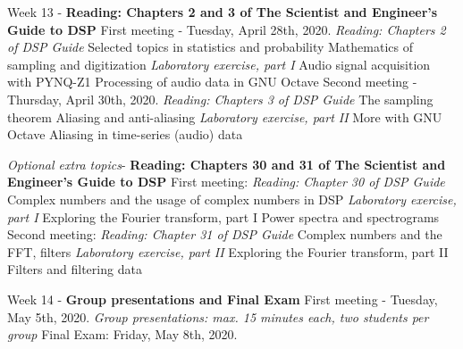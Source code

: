 \documentclass[10pt]{article}
\begin{document}
\begin{outline}[enumerate]
\1 Week 13 - \textbf{Reading: Chapters 2 and 3 of The Scientist and Engineer's Guide to DSP}
\2 First meeting - Tuesday, April 28th, 2020. \textit{Reading: Chapters 2 of DSP Guide}
\3 Selected topics in statistics and probability
\3 Mathematics of sampling and digitization
\3 \textit{Laboratory exercise, part I}
\4 Audio signal acquisition with PYNQ-Z1
\4 Processing of audio data in GNU Octave
\2 Second meeting - Thursday, April 30th, 2020. \textit{Reading: Chapters 3 of DSP Guide}
\3 The sampling theorem
\3 Aliasing and anti-aliasing
\3 \textit{Laboratory exercise, part II}
\4 More with GNU Octave
\4 Aliasing in time-series (audio) data

\1 \textit{Optional extra topics}- \textbf{Reading: Chapters 30 and 31 of The Scientist and Engineer's Guide to DSP}
\2 First meeting: \textit{Reading: Chapter 30 of DSP Guide}
\3 Complex numbers and the usage of complex numbers in DSP
\3 \textit{Laboratory exercise, part I}
\4 Exploring the Fourier transform, part I
\4 Power spectra and spectrograms
\2 Second meeting: \textit{Reading: Chapter 31 of DSP Guide}
\3 Complex numbers and the FFT, filters
\3 \textit{Laboratory exercise, part II}
\4 Exploring the Fourier transform, part II
\4 Filters and filtering data

\1 Week 14 - \textbf{Group presentations and Final Exam}
\2 First meeting - Tuesday, May 5th, 2020.
\3 \textit{Group presentations: max. 15 minutes each, two students per group}
\1 Final Exam: Friday, May 8th, 2020.
\end{outline}
\end{document}
